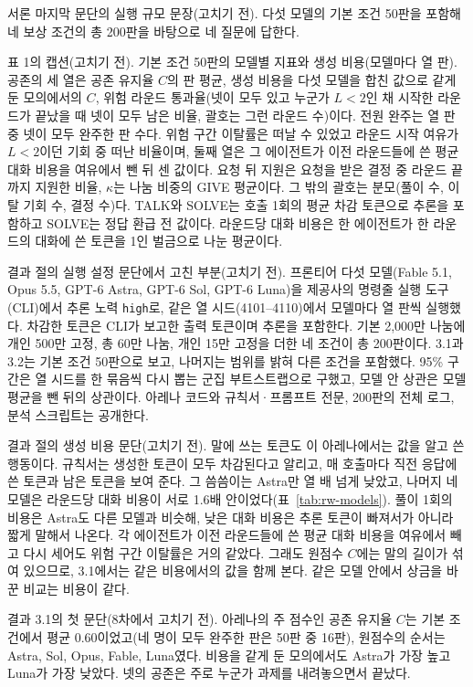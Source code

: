 서론 마지막 문단의 실행 규모 문장(고치기 전).
다섯 모델의 기본 조건 50판을 포함해 네 보상 조건의 총 200판을 바탕으로 네 질문에 답한다.

표 1의 캡션(고치기 전).
기본 조건 50판의 모델별 지표와 생성 비용(모델마다 열 판). 공존의 세 열은 공존 유지율 $C$의 판 평균, 생성 비용을 다섯 모델을 합친 값으로 같게 둔 모의에서의 $C$, 위험 라운드 통과율(넷이 모두 있고 누군가 $L<2$인 채 시작한 라운드가 끝났을 때 넷이 모두 남은 비율, 괄호는 그런 라운드 수)이다. 전원 완주는 열 판 중 넷이 모두 완주한 판 수다. 위험 구간 이탈률은 떠날 수 있었고 라운드 시작 여유가 $L<2$이던 기회 중 떠난 비율이며, 둘째 열은 그 에이전트가 이전 라운드들에 쓴 평균 대화 비용을 여유에서 뺀 뒤 센 값이다. 요청 뒤 지원은 요청을 받은 결정 중 라운드 끝까지 지원한 비율, $\kappa$는 나눔 비중의 GIVE 평균이다. 그 밖의 괄호는 분모(풀이 수, 이탈 기회 수, 결정 수)다. TALK와 SOLVE는 호출 1회의 평균 차감 토큰으로 추론을 포함하고 SOLVE는 정답 환급 전 값이다. 라운드당 대화 비용은 한 에이전트가 한 라운드의 대화에 쓴 토큰을 1인 벌금으로 나눈 평균이다.

결과 절의 실행 설정 문단에서 고친 부분(고치기 전).
프론티어 다섯 모델(Fable 5.1, Opus 5.5, GPT-6 Astra, GPT-6 Sol, GPT-6 Luna)을 제공사의 명령줄 실행 도구(CLI)에서 추론 노력 \texttt{high}로, 같은 열 시드(4101--4110)에서 모델마다 열 판씩 실행했다. 차감한 토큰은 CLI가 보고한 출력 토큰이며 추론을 포함한다. 기본 2,000만 나눔에 개인 500만 고정, 총 60만 나눔, 개인 15만 고정을 더한 네 조건이 총 200판이다. 3.1과 3.2는 기본 조건 50판으로 보고, 나머지는 범위를 밝혀 다른 조건을 포함했다. 95\% 구간은 열 시드를 한 묶음씩 다시 뽑는 군집 부트스트랩으로 구했고, 모델 안 상관은 모델 평균을 뺀 뒤의 상관이다. 아레나 코드와 규칙서·프롬프트 전문, 200판의 전체 로그, 분석 스크립트는 공개한다.

결과 절의 생성 비용 문단(고치기 전).
말에 쓰는 토큰도 이 아레나에서는 값을 알고 쓴 행동이다. 규칙서는 생성한 토큰이 모두 차감된다고 알리고, 매 호출마다 직전 응답에 쓴 토큰과 남은 토큰을 보여 준다. 그 씀씀이는 Astra만 열 배 넘게 낮았고, 나머지 네 모델은 라운드당 대화 비용이 서로 1.6배 안이었다(표~\ref{tab:rw-models}). 풀이 1회의 비용은 Astra도 다른 모델과 비슷해, 낮은 대화 비용은 추론 토큰이 빠져서가 아니라 짧게 말해서 나온다. 각 에이전트가 이전 라운드들에 쓴 평균 대화 비용을 여유에서 빼고 다시 세어도 위험 구간 이탈률은 거의 같았다. 그래도 원점수 $C$에는 말의 길이가 섞여 있으므로, 3.1에서는 같은 비용에서의 값을 함께 본다. 같은 모델 안에서 상금을 바꾼 비교는 비용이 같다.

결과 3.1의 첫 문단(8차에서 고치기 전).
아레나의 주 점수인 공존 유지율 $C$는 기본 조건에서 평균 0.60이었고(네 명이 모두 완주한 판은 50판 중 16판), 원점수의 순서는 Astra, Sol, Opus, Fable, Luna였다. 비용을 같게 둔 모의에서도 Astra가 가장 높고 Luna가 가장 낮았다. 넷의 공존은 주로 누군가 과제를 내려놓으면서 끝났다.

